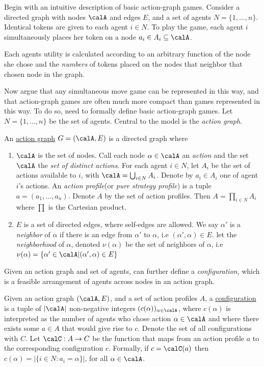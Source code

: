 Begin with an intuitive description of basic action-graph games. Consider a directed graph with nodes $\calA$ and edges $E$, and a set of agents $N = \{1, \dots, n\}$. Identical tokens are given to each agent $i \in N$. To play the game, each agent $i$ simultaneously places her token on a node $a_i \in A_i \subseteq\calA$.

Each agents utility is calculated according to an arbitrary function of the node she chose and the \emph{numbers} of tokens placed on the nodes that neighbor that chosen node in the graph.

Now argue that any simultaneous move game can be represented in this way, and that action-graph games are often much more compact than games represented in this way. To do so, need to formally define basic action-graph games. Let $N = \{1, \dots, n\}$ be the set of agents. Central to the model is the \emph{action graph}.
\begin{definition}
	\label{def:AGG-2.1}
	An \underline{action graph} $G = (\calA, E)$ is a directed graph where 
	\begin{enumerate}
		\item $\calA$ is the set of nodes. Call each node $\alpha \in \calA$ an \emph{action} and the set $\calA$ the \emph{set of distinct actions}. For each agent $i \in N$, let $A_i$ be the set of actions available to $i$, with $\calA = \bigcup_{i\in N} A_i$. Denote by $a_i \in A_i$ one of agent $i$'s actions. An \emph{action profile}(or \emph{pure strategy profile}) is a tuple \(a = (a_1, \dots, a_n)\). Denote $A$ by the set of action profiles. Then $A = \prod_{i\in N} A_i$ where $\prod$ is the Cartesian product.
		\item $E$ is a set of directed edges, where self-edges are allowed. We say $\alpha'$ is a \emph{neighbor} of $\alpha$ if there is an edge from $\alpha'$ to $\alpha$, i.e $(\alpha', \alpha)\in E$. let the \emph{neighborhood} of $\alpha$, denoted $\nu(\alpha)$ be the set of neighbors of $\alpha$, i.e $\nu(\alpha) = \{\alpha'\in\calA|(\alpha',\alpha)\in E\}$
	\end{enumerate}
\end{definition}

Given an action graph and set of agents, can further define a \emph{configuration}, which is a feasible arrangement of agents across nodes in an action graph. 
\begin{definition}[Configuration]
	\label{def:AGG-2.2}
	Given an action graph $(\calA, E)$, and a set of action profiles $A$, a \underline{configuration} is a tuple of $|\calA|$ non-negative integers $(c(\alpha))_{\alpha \in \calA}$, where $c(\alpha)$ is interpreted as the number of agents who chose action $\alpha \in \calA$ and where there exists some $a \in A$ that would give rise to $c$. Denote the set of all configurations with $C$. Let $\calC:A\to C$ be the function that maps from an action profile $a$ to the corresponding configuration $c$. Formally, if $c = \calC(a)$ then $c(\alpha) = |\{i\in N: a_i = \alpha\}|$, for all $\alpha \in \calA$.
\end{definition}

